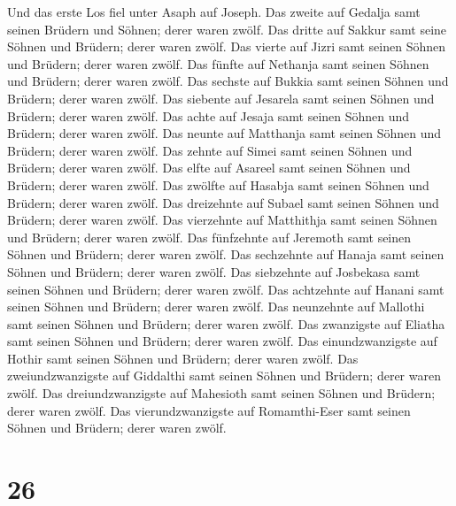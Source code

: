  Und das erste Los fiel unter Asaph auf Joseph. Das zweite
auf Gedalja samt seinen Brüdern und Söhnen; derer waren zwölf.
 Das dritte auf Sakkur samt seine Söhnen und Brüdern; derer
waren zwölf.  Das vierte auf Jizri samt seinen Söhnen und
Brüdern; derer waren zwölf.  Das fünfte auf Nethanja samt
seinen Söhnen und Brüdern; derer waren zwölf.  Das sechste
auf Bukkia samt seinen Söhnen und Brüdern; derer waren zwölf.
 Das siebente auf Jesarela samt seinen Söhnen und Brüdern;
derer waren zwölf.  Das achte auf Jesaja samt seinen Söhnen
und Brüdern; derer waren zwölf.  Das neunte auf Matthanja
samt seinen Söhnen und Brüdern; derer waren zwölf.  Das
zehnte auf Simei samt seinen Söhnen und Brüdern; derer waren zwölf.
 Das elfte auf Asareel samt seinen Söhnen und Brüdern;
derer waren zwölf.  Das zwölfte auf Hasabja samt seinen
Söhnen und Brüdern; derer waren zwölf.  Das dreizehnte auf
Subael samt seinen Söhnen und Brüdern; derer waren zwölf. 
Das vierzehnte auf Matthithja samt seinen Söhnen und Brüdern; derer
waren zwölf.  Das fünfzehnte auf Jeremoth samt seinen
Söhnen und Brüdern; derer waren zwölf.  Das sechzehnte auf
Hanaja samt seinen Söhnen und Brüdern; derer waren zwölf. 
Das siebzehnte auf Josbekasa samt seinen Söhnen und Brüdern; derer waren
zwölf.  Das achtzehnte auf Hanani samt seinen Söhnen und
Brüdern; derer waren zwölf.  Das neunzehnte auf Mallothi
samt seinen Söhnen und Brüdern; derer waren zwölf.  Das
zwanzigste auf Eliatha samt seinen Söhnen und Brüdern; derer waren
zwölf.  Das einundzwanzigste auf Hothir samt seinen Söhnen
und Brüdern; derer waren zwölf.  Das zweiundzwanzigste auf
Giddalthi samt seinen Söhnen und Brüdern; derer waren zwölf.
 Das dreiundzwanzigste auf Mahesioth samt seinen Söhnen und
Brüdern; derer waren zwölf.  Das vierundzwanzigste auf
Romamthi-Eser samt seinen Söhnen und Brüdern; derer waren zwölf.

\hypertarget{section-25}{%
\section{26}\label{section-25}}


